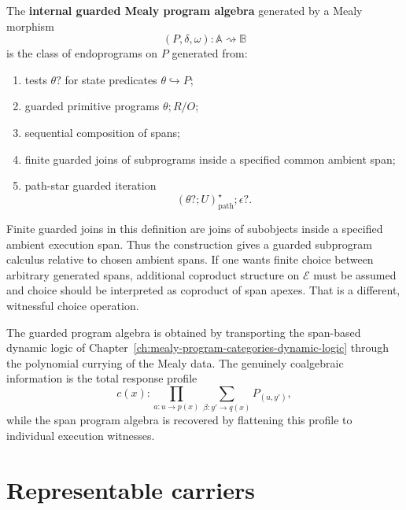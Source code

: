 \begin{definition}
\label{def:internal-guarded-mealy-program-algebra}
The \textbf{internal guarded Mealy program algebra} generated by a Mealy
morphism
\[
(P,\delta,\omega):\mathbb A\rightsquigarrow\mathbb B
\]
is the class of endoprograms on \(P\) generated from:
\begin{enumerate}
\item tests \(\theta?\) for state predicates \(\theta\hookrightarrow P\);
\item guarded primitive programs \(\theta;R/O\);
\item sequential composition of spans;
\item finite guarded joins of subprograms inside a specified common
ambient span;
\item path-star guarded iteration
\[
(\theta?;U)^\star_{\mathrm{path}};\epsilon?.
\]
\end{enumerate}
\end{definition}

\begin{remark}
\label{rem:common-ambient-versus-arbitrary-choice}
Finite guarded joins in this definition are joins of subobjects inside a
specified ambient execution span. Thus the construction gives a guarded
subprogram calculus relative to chosen ambient spans. If one wants finite
choice between arbitrary generated spans, additional coproduct structure on
\(\mathcal E\) must be assumed and choice should be interpreted as
coproduct of span apexes. That is a different, witnessful choice
operation.
\end{remark}

\begin{remark}
\label{rem:guarded-program-structure}
The guarded program algebra is obtained by transporting the span-based
dynamic logic of Chapter~\ref{ch:mealy-program-categories-dynamic-logic}
through the polynomial currying of the Mealy data. The genuinely
coalgebraic information is the total response profile
\[
c(x):
\prod_{a:u\to p(x)}
\sum_{\beta:y'\to q(x)}
P_{(u,y')},
\]
while the span program algebra is recovered by flattening this profile to
individual execution witnesses.
\end{remark}

\section{Representable carriers}
\label{sec:representable-carriers-polynomial-coalgebra}

